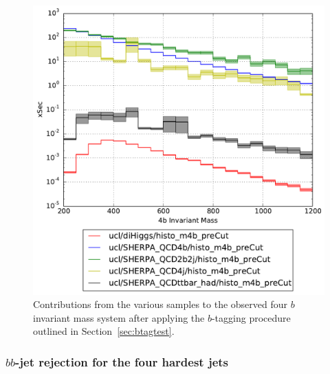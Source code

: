 \documentclass[12pt]{article}
\begin{document}
\begin{figure}[h!]
\begin{center}
\includegraphics[width=\textwidth]{plots/m4b_ucl_preCut.pdf}
\caption{Contributions from the various samples to the observed four $b$ invariant mass system after applying the $b$-tagging procedure outlined in Section~\ref{sec:btagtest}.}
\end{center}
\end{figure}


\subsubsection{$bb$-jet rejection for the four hardest jets}
\end{document}
